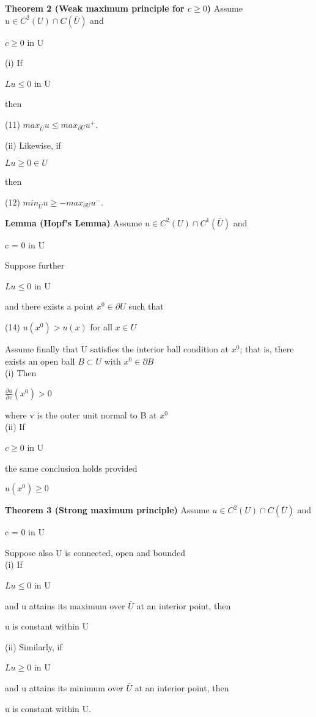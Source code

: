 \documentclass{article}
\newcommand\tab[1][1cm]{\hspace*{#1}}
\begin{document}
\textbf {Theorem 2 (Weak maximum principle for $c \geq 0$)} Assume $u \in C^2(U) \cap C(\bar{U})$ and 
\begin{center}
$c \geq 0$ \tab in U
\end{center}
\tab (i) If
\begin{center}
$Lu \leq 0$ \tab in U
\end{center}
\tab then
\begin{center}
(11) \tab $max_{\bar{U}} u \leq max_{\partial U} u^+$.
\end{center}
\tab (ii) Likewise, if
\begin{center}
$Lu \geq 0 \in U$
\end{center}
then
\begin{center}
(12) \tab $min_{\bar{U}} u \geq - max_{\partial U} u^-$.
\end{center}

\textbf {Lemma (Hopf's Lemma)} Assume $u \in C^2(U) \cap C^1 (\bar{U})$ and 
\begin{center}
c = 0 \tab in U
\end{center}
Suppose further
\begin{center}
$Lu \leq 0$ \tab in U
\end{center}
and there exists a point $x^0 \in \partial U$ such that
\begin{center}
(14) \tab $u (x^0) > u(x)$ \tab for all $x \in U$
\end{center}
Assume finally that U satisfies the interior ball condition at $x^0$; that is, there exists an open ball $B \subset U$ with $x^0 \in \partial B$ \\
\tab (i) Then
\begin{center}
$\frac{\partial u}{\partial v} (x^0) > 0$
\end{center}
where v is the outer unit normal to B at $x^0$ \\
\tab (ii) If
\begin{center}
$c \geq 0$ \tab in U
\end{center}
the same conclusion holds provided 
\begin{center}
$u(x^0) \geq 0$
\end{center}

\textbf {Theorem 3 (Strong maximum principle)} Assume $u \in C^2(U) \cap C(\bar{U})$ and 
\begin{center}
c = 0 \tab in U
\end{center}
Suppose also U is connected, open and bounded \\
\tab (i) If
\begin{center}
$Lu \leq 0$ \tab in U
\end{center}
and u attains its maximum over $\bar{U}$ at an interior point, then
\begin{center}
u is constant within U
\end{center}
\tab (ii) Similarly, if
\begin{center}
$Lu \geq 0$ \tab in U
\end{center}
and u attains its minimum over $\bar{U}$ at an interior point, then
\begin{center}
u is constant within U.
\end{center}
\end{document}
